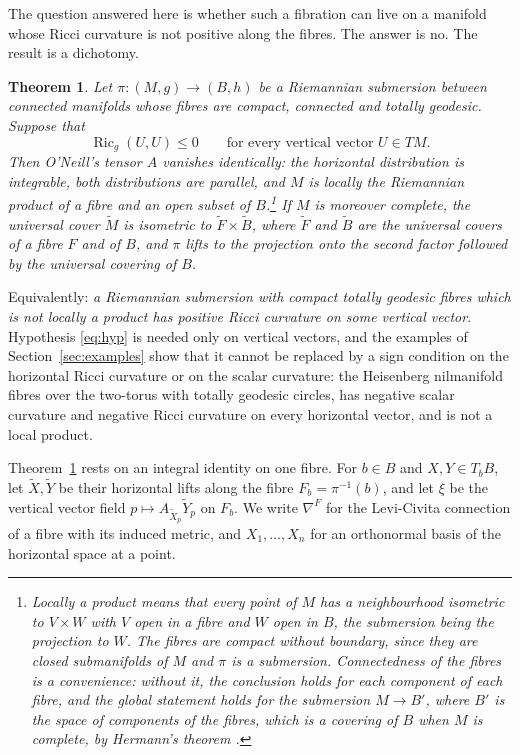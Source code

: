 \documentclass[11pt,reqno]{amsart}
\theoremstyle{plain}
\newtheorem{theorem}{Theorem}[section]
\theoremstyle{definition}
\newcommand{\Ric}{\operatorname{Ric}}
\newcommand{\bas}[1]{\widetilde{#1}}
\begin{document}
The question answered here is whether such a fibration can live on a manifold whose Ricci curvature is not positive along the fibres. The answer is no. The result is a dichotomy.

\begin{theorem}\label{thm:main}
Let $\pi\colon (M,g)\to (B,h)$ be a Riemannian submersion between connected manifolds whose fibres are compact, connected and totally geodesic. Suppose that
\begin{equation}\label{eq:hyp}
\Ric_g(U,U)\le 0\qquad\text{for every vertical vector }U\in TM.
\end{equation}
Then O'Neill's tensor $A$ vanishes identically: the horizontal distribution is integrable, both distributions are parallel, and $M$ is locally the Riemannian product of a fibre and an open subset of $B$.\footnote{Locally a product means that every point of $M$ has a neighbourhood isometric to $V\times W$ with $V$ open in a fibre and $W$ open in $B$, the submersion being the projection to $W$. The fibres are compact without boundary, since they are closed submanifolds of $M$ and $\pi$ is a submersion. Connectedness of the fibres is a convenience: without it, the conclusion holds for each component of each fibre, and the global statement holds for the submersion $M\to B'$, where $B'$ is the space of components of the fibres, which is a covering of $B$ when $M$ is complete, by Hermann's theorem \cite{Hermann1960}.} If $M$ is moreover complete, the universal cover $\bas M$ is isometric to $\bas F\times\bas B$, where $\bas F$ and $\bas B$ are the universal covers of a fibre $F$ and of $B$, and $\pi$ lifts to the projection onto the second factor followed by the universal covering of $B$.
\end{theorem}

Equivalently: \emph{a Riemannian submersion with compact totally geodesic fibres which is not locally a product has positive Ricci curvature on some vertical vector}. Hypothesis \eqref{eq:hyp} is needed only on vertical vectors, and the examples of Section~\ref{sec:examples} show that it cannot be replaced by a sign condition on the horizontal Ricci curvature or on the scalar curvature: the Heisenberg nilmanifold fibres over the two-torus with totally geodesic circles, has negative scalar curvature and negative Ricci curvature on every horizontal vector, and is not a local product.

Theorem~\ref{thm:main} rests on an integral identity on one fibre. For $b\in B$ and $X,Y\in T_bB$, let $\bas X,\bas Y$ be their horizontal lifts along the fibre $F_b=\pi^{-1}(b)$, and let $\xi$ be the vertical vector field $p\mapsto A_{\bas X_p}\bas Y_p$ on $F_b$. We write $\nabla^F$ for the Levi-Civita connection of a fibre with its induced metric, and $X_1,\dots,X_n$ for an orthonormal basis of the horizontal space at a point.
\end{document}
